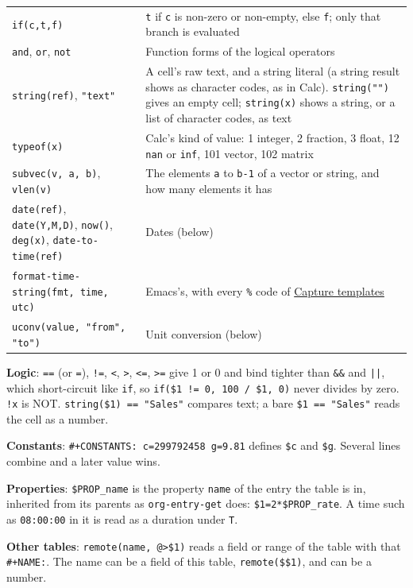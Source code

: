 \documentclass[11pt]{article}
\begin{document}
\begin{center}
\begin{tabular}{ll}
\texttt{if(c,t,f)} & \texttt{t} if \texttt{c} is non-zero or non-empty, else \texttt{f}; only that branch is evaluated\\[0pt]
\texttt{and}, \texttt{or}, \texttt{not} & Function forms of the logical operators\\[0pt]
\texttt{string(ref)}, \texttt{"text"} & A cell's raw text, and a string literal (a string result shows as character codes, as in Calc). \texttt{string("")} gives an empty cell; \texttt{string(x)} shows a string, or a list of character codes, as text\\[0pt]
\texttt{typeof(x)} & Calc's kind of value: 1 integer, 2 fraction, 3 float, 12 \texttt{nan} or \texttt{inf}, 101 vector, 102 matrix\\[0pt]
\texttt{subvec(v, a, b)}, \texttt{vlen(v)} & The elements \texttt{a} to \texttt{b-1} of a vector or string, and how many elements it has\\[0pt]
\texttt{date(ref)}, \texttt{date(Y,M,D)}, \texttt{now()}, \texttt{deg(x)}, \texttt{date-to-time(ref)} & Dates (below)\\[0pt]
\texttt{format-time-string(fmt, time, utc)} & Emacs's, with every \texttt{\%} code of \hyperref[sec:org0116725]{Capture templates}\\[0pt]
\texttt{uconv(value, "from", "to")} & Unit conversion (below)\\[0pt]
\end{tabular}
\end{center}

\textbf{Logic}: \texttt{==} (or \texttt{=}), \texttt{!=}, \texttt{<}, \texttt{>}, \texttt{<=}, \texttt{>=} give 1 or 0 and bind tighter than \texttt{\&\&} and \texttt{||}, which short-circuit like \texttt{if}, so \texttt{if(\$1 != 0, 100 / \$1, 0)} never divides by zero. \texttt{!x} is NOT. \texttt{string(\$1) == "Sales"} compares text; a bare \texttt{\$1 == "Sales"} reads the cell as a number.

\textbf{Constants}: \texttt{\#+CONSTANTS: c=299792458 g=9.81} defines \texttt{\$c} and \texttt{\$g}. Several lines combine and a later value wins.

\textbf{Properties}: \texttt{\$PROP\_name} is the property \texttt{name} of the entry the table is in, inherited from its parents as \texttt{org-entry-get} does: \texttt{\$1=2*\$PROP\_rate}. A time such as \texttt{08:00:00} in it is read as a duration under \texttt{T}.

\textbf{Other tables}: \texttt{remote(name, @>\$1)} reads a field or range of the table with that \texttt{\#+NAME:}. The name can be a field of this table, \texttt{remote(\$<, @>\$1)}, and can be a number.
\end{document}
